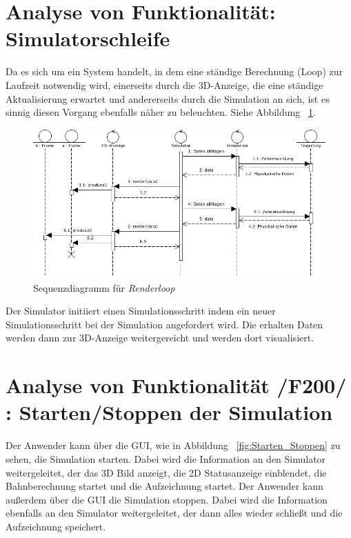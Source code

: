
\section{Analyse von Funktionalität: Simulatorschleife}
Da es sich um ein System handelt, in dem eine ständige Berechnung (Loop) zur Laufzeit notwendig wird, einerseits durch die 3D-Anzeige, die eine ständige Aktualisierung erwartet und andererseits durch die Simulation an sich, ist es sinnig diesen Vorgang ebenfalls näher zu beleuchten. Siehe Abbildung ~\ref{fig:render_loop}.

\begin{figure}[h!]
\includegraphics[width=\linewidth]{bilder/render_loop}
\caption{Sequenzdiagramm für \textit{Renderloop}}
\label{fig:render_loop}
\end{figure}

Der Simulator initiiert einen Simulationsschritt indem ein neuer Simulationsschritt bei der Simulation angefordert wird. Die erhalten Daten werden dann zur 3D-Anzeige weitergereicht und werden dort visualisiert.

\section{Analyse von Funktionalität /F200/ :  Starten/Stoppen der Simulation}
Der Anwender kann über die GUI, wie in Abbildung ~\ref{fig:Starten_Stoppen} zu sehen, die Simulation starten. Dabei wird die Information an den Simulator weitergeleitet, der das 3D Bild anzeigt, die 2D Statusanzeige einblendet, die Bahnberechnung startet und die Aufzeichnung startet. 
Der Anwender kann außerdem über die GUI die Simulation stoppen. Dabei wird die Information ebenfalls an den Simulator weitergeleitet, der dann alles wieder schließt und die Aufzeichnung speichert.


